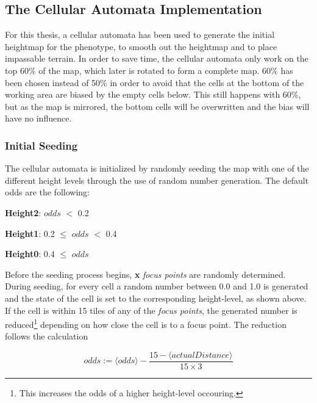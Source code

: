 \subsection{The Cellular Automata Implementation}
\label{methodology_ca_our}

For this thesis, a cellular automata has been used to generate the initial heightmap for the phenotype, to smooth out the heightmap and to place impassable terrain. In order to save time, the cellular automata only work on the top 60\% of the map, which later is rotated to form a complete map. 60\% has been chosen instead of 50\% in order to avoid that the cells at the bottom of the working area are biased by the empty cells below. This still happens with 60\%, but as the map is mirrored, the bottom cells will be overwritten and the bias will have no influence.

\subsubsection{Initial Seeding}
\label{methodology_ca_our_initial}

The cellular automata is initialized by randomly seeding the map with one of the different height levels through the use of random number generation. The default odds are the following:

\begin{my_itemize}

	\item \textbf{Height2}: $odds$ $<$ 0.2

	\item \textbf{Height1}: 0.2 $\le$ $odds$ $<$ 0.4

	\item \textbf{Height0}: 0.4 $\le$ $odds$

\end{my_itemize}

Before the seeding process begins, \textbf{x} \textit{focus points} are randomly determined. During seeding, for every cell a random number between 0.0 and 1.0 is generated and the state of the cell is set to the corresponding height-level, as shown above. If the cell is within 15 tiles of any of the \textit{focus points}, the generated number is reduced\footnote{This increases the odds of a higher height-level occouring.} depending on how close the cell is to a focus point. The reduction follows the calculation

\begin{equation} \label{eq:oddsReduction}
	odds := \langle odds\rangle - \frac{15 - \langle actualDistance\rangle}{15 \times 3}
\end{equation}

